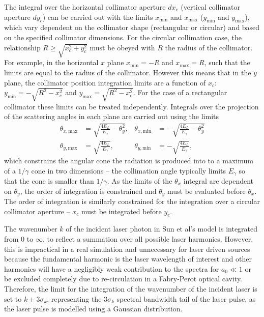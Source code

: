\documentclass[../main.tex]{subfiles}
\begin{document}
The integral over the horizontal collimator aperture $dx_{c}$ (vertical collimator aperture $dy_{c}$) can be carried out with the limits $x_{\mathrm{min}}$ and $x_{\mathrm{max}}$ ($y_{\mathrm{min}}$ and $y_{\mathrm{max}}$), which vary dependent on the collimator shape (rectangular or circular) and based on the specified collimator dimensions. For the circular collimation case, the relationship $R\geq\sqrt{x_{c}^{2}+y_{c}^{2}}$ must be obeyed with $R$ the radius of the collimator. For example, in the horizontal $x$ plane $x_{\mathrm{min}} = -R$ and $x_{\mathrm{max}} = R$, such that the limits are equal to the radius of the collimator. However this means that in the $y$ plane, the collimator position integration limits are a function of $x_{c}$: $y_{\mathrm{min}} = -\sqrt{R^{2}-x_{c}^{2}}$ and $y_{\mathrm{max}} = \sqrt{R^{2}-x_{c}^{2}}$. For the case of a rectangular collimator these limits can be treated independently.  
Integrals over the projection of the scattering angles in each plane are carried out using the limits
\begin{align}
\theta_{x,\mathrm{max}} &= \sqrt{\frac{4E_{L}}{E_{\gamma}}-\theta_{y}^{2}}, & \theta_{x,\mathrm{min}} &= -\sqrt{\frac{4E_{L}}{E_{\gamma}}-\theta_{y}^{2}} \nonumber\\ 
\theta_{y,\mathrm{max}} &= \sqrt{\frac{4E_{L}}{E_{\gamma}}}, & \theta_{y,\mathrm{min}} &= -\sqrt{\frac{4E_{L}}{E_{\gamma}}},  
\end{align}
which constrains the angular cone the radiation is produced into to a maximum of a $1/\gamma$ cone in two dimensions -- the collimation angle typically limits $E_{\gamma}$ so that the cone is smaller than $1/\gamma$. As the limits of the $\theta_{x}$ integral are dependent on $\theta_{y}$, the order of integration is constrained and $\theta_{y}$ must be evaluated before $\theta_{x}$. The order of integration is similarly constrained for the integration over a circular collimator aperture -- $x_{c}$ must be integrated before $y_{c}$.

The wavenumber $k$ of the incident laser photon in Sun et al's model \cite{sun2009characterizations,sun2011theoretical} is integrated from $0$ to $\infty$, to reflect a summation over all possible laser harmonics. However, this is impractical in a real simulation and unnecessary for laser driven sources because the fundamental harmonic is the laser wavelength of interest and other harmonics will have a negligibly weak contribution to the spectra for $a_{0} \ll 1$ or be excluded completely due to re-circulation in a Fabry-Perot optical cavity. Therefore, the limit for the integration of the wavenumber of the incident laser is set to $k\pm3\sigma_{k}$, representing the 3$\sigma_{k}$ spectral bandwidth tail of the laser pulse, as the laser pulse is modelled using a Gaussian distribution.  
\end{document}
